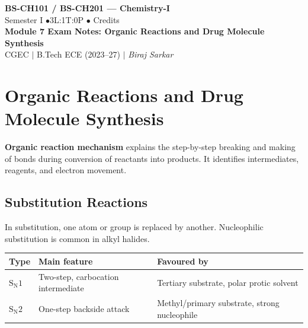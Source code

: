 \documentclass[12pt,a4paper]{article}
\begin{document}
\begin{center}
  {\LARGE\bfseries\color{myred} BS-CH101 / BS-CH201 --- Chemistry-I}\\[5pt]
  {\normalsize\color{mydark} Semester I \quad$\bullet$\quad 3L:1T:0P \quad$\bullet$ Credits}\\[3pt]
  {\normalsize\color{myteal}\textbf{Module 7 Exam Notes: Organic Reactions and Drug Molecule Synthesis}}\\[3pt]
  {\small\color{mydark} CGEC \;$|$\; B.Tech ECE (2023--27) \;$|$\; \textit{Biraj Sarkar}}
\end{center}
\vspace{2pt}
\noindent{\color{myred}\rule{\linewidth}{1.5pt}}
\vspace{2pt}

\hypersetup{linkcolor=mydark}
\tableofcontents
\hypersetup{linkcolor=myteal}
\newpage
\section{Organic Reactions and Drug Molecule Synthesis}

\begin{tcolorbox}[defbox]
\textbf{Organic reaction mechanism} explains the step-by-step breaking and making of bonds during conversion of reactants into products. It identifies intermediates, reagents, and electron movement.
\end{tcolorbox}

\subsection{Substitution Reactions}
In substitution, one atom or group is replaced by another. Nucleophilic substitution is common in alkyl halides.

\begin{tabularx}{\linewidth}{|B{2.8cm}|Y|Y|}
\hline
\textbf{Type} & \textbf{Main feature} & \textbf{Favoured by} \\
\hline
$\mathrm{S_N1}$ & Two-step, carbocation intermediate & Tertiary substrate, polar protic solvent \\
\hline
$\mathrm{S_N2}$ & One-step backside attack & Methyl/primary substrate, strong nucleophile \\
\hline
\end{tabularx}
\end{document}
